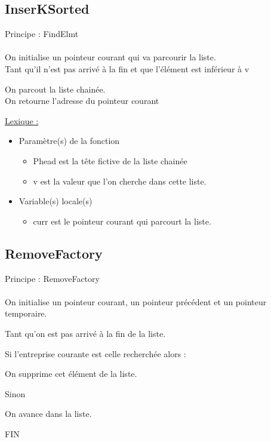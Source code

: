 \documentclass[a4paper]{article}
\newcommand\tab[1][1cm]{\hspace*{#1}}
\begin{document}
\subsection{InserKSorted}
\begin{algorithm}
Principe : FindElmt
\\
\\
\tab On initialise un pointeur courant qui va parcourir la liste. 
\\
\tab Tant qu'il n'est pas arrivé à la fin et que l'élément est inférieur à v 

\tab \tab On parcout la liste chainée.
\\
\tab On retourne l'adresse du pointeur courant 
\end{algorithm}
\underline{Lexique :}
\begin{itemize}
\item Paramètre(s) de la fonction  
\begin{itemize}
\item Phead est la tête fictive de la liste chainée
\item v est la valeur que l'on cherche dans cette liste.
\end{itemize}
\item Variable(s) locale(s)
\begin{itemize}
\item curr est le pointeur courant qui parcourt la liste.
\end{itemize}
\end{itemize}

\newpage
\subsection{RemoveFactory}
\begin{algorithm}
Principe : RemoveFactory
\\
\\
\tab On initialise un pointeur courant, un pointeur précédent et un pointeur temporaire. 

\tab Tant qu'on est pas arrivé à la fin de la liste.

\tab \tab Si l'entreprise courante est celle recherchée alors : 

\tab \tab \tab On supprime cet élément de la liste.

\tab \tab Sinon

\tab \tab \tab On avance dans la liste.

FIN
\end{algorithm}
\end{document}
